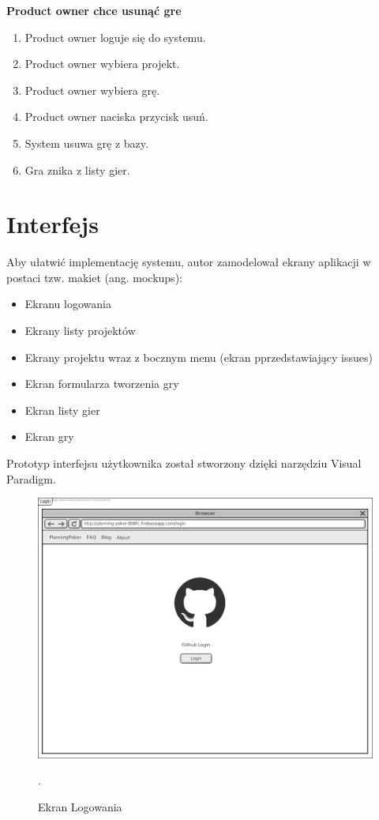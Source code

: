 \textbf{Product owner chce usunąć gre}

\begin{enumerate}
    \item Product owner loguje się do systemu.
    \item Product owner wybiera projekt.
    \item Product owner wybiera grę.
    \item Product owner naciska przycisk usuń.
    \item System usuwa grę z bazy.
    \item Gra znika z listy gier.
\end{enumerate}

\section{Interfejs}

Aby ułatwić implementację systemu, autor zamodelował ekrany aplikacji w postaci
tzw. makiet (ang. mockups):

\begin{itemize}
    \item Ekranu logowania
    \item Ekrany listy projektów
    \item Ekrany projektu wraz z bocznym menu (ekran pprzedstawiający issues)
    \item Ekran formularza tworzenia gry
    \item Ekran listy gier
    \item Ekran gry
\end{itemize}

Prototyp interfejsu użytkownika został stworzony dzięki narzędziu Visual Paradigm.

\begin{figure}[H]
	\centering\includegraphics[width=.7\textwidth]{img/LoginScreen}
	\caption{Ekran Logowania}.
	\label{rys:loginScreen}
\end{figure}

